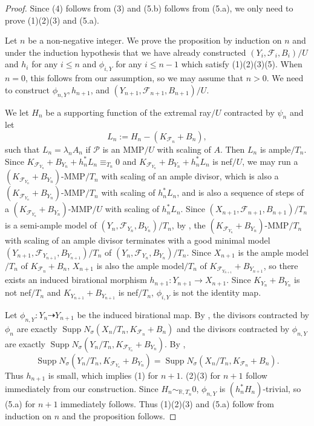 \documentclass[preprint,12pt]{elsarticle}
\newcommand{\Supp}{\operatorname{Supp}}
\newcommand{\Ff}{\mathcal{F}}
\begin{document}
\begin{proof}
Since (4) follows from (3) and (5.b) follows from (5.a), we only need to prove (1)(2)(3) and (5.a).

Let $n$ be a non-negative integer. We prove the proposition by induction on $n$ and under the induction hypothesis that we have already constructed $(Y_i,\Ff_i,B_i)/U$ and $h_i$ for any $i\leq n$ and $\phi_{i,Y}$ for any $i\leq n-1$ which satisfy (1)(2)(3)(5). When $n=0$, this follows from our assumption, so we may assume that $n>0$. We need to construct $\phi_{n,Y},h_{n+1}$, and $(Y_{n+1},\Ff_{n+1},B_{n+1})/U$.

We let $H_n$ be a supporting function of the extremal ray$/U$ contracted by $\psi_n$ and let  
$$L_n:=H_n-(K_{\Ff_n}+B_n),$$
such that $L_n=\lambda_nA_n$ if $\mathcal{P}$ is an MMP$/U$ with scaling of $A$. Then $L_n$ is ample$/T_n$. Since $K_{\Ff_{Y_n}}+B_{Y_n}+h_n^*L_n\equiv_{T_n}0$ and $K_{\Ff_{Y_n}}+B_{Y_n}+h_n^*L_n$ is nef$/U$, we may run a $(K_{\Ff_{Y_n}}+B_{Y_n})$-MMP$/T_n$ with scaling of an ample divisor, which is also a $(K_{\Ff_{Y_n}}+B_{Y_n})$-MMP$/T_n$ with scaling of $h_n^*L_n$, and is also a sequence of steps of a $(K_{\Ff_{Y_n}}+B_{Y_n})$-MMP$/U$ with scaling of $h_n^*L_n$. Since $(X_{n+1},\Ff_{n+1},B_{n+1})/T_n$ is a semi-ample model of $(Y_{n},\Ff_{Y_n},B_{Y_n})/T_n$, by \cite[Theorem 1.11]{LMX24b}, the  $(K_{\Ff_{Y_n}}+B_{Y_n})$-MMP$/T_n$ with scaling of an ample divisor terminates with a good minimal model $(Y_{n+1},\Ff_{Y_{n+1}},B_{Y_{n+1}})/T_n$ of $(Y_{n},\Ff_{Y_{n}},B_{Y_{n}})/T_n$. Since $X_{n+1}$ is the ample model$/T_n$ of $K_{\Ff_n}+B_n$, $X_{n+1}$ is also the ample model$/T_n$ of $K_{\Ff_{Y_{n+1}}}+B_{Y_{n+1}}$, so there exists an induced birational morphism $h_{n+1}: Y_{n+1}\rightarrow X_{n+1}$. Since $K_{Y_n}+B_{Y_n}$ is not nef$/T_n$ and $K_{Y_{n+1}}+B_{Y_{n+1}}$ is nef$/T_n$, $\phi_{i,Y}$ is not the identity map.

Let $\phi_{n,Y}: Y_n\dashrightarrow Y_{n+1}$ be the induced birational map. By \cite[Lemma 2.25]{LMX24b}, the divisors contracted by $\phi_n$ are exactly $\Supp N_{\sigma}(X_n/T_n,K_{\Ff_n}+B_n)$ and the divisors contracted by $\phi_{n,Y}$ are exactly $\Supp N_{\sigma}(Y_n/T_n,K_{\Ff_{Y_n}}+B_{Y_n})$. By \cite[Lemma 3.4(2)(3)]{LX23a}, 
$$\Supp N_{\sigma}(Y_n/T_n,K_{\Ff_{Y_n}}+B_{Y_n})=\Supp N_{\sigma}(X_n/T_n,K_{\Ff_n}+B_n).$$
Thus $h_{n+1}$ is small, which implies (1) for $n+1$. (2)(3) for $n+1$ follow immediately from our construction. Since $H_n\sim_{\mathbb R,T_n}0$, $\phi_{n,Y}$ is $(h_n^*H_n)$-trivial, so (5.a) for $n+1$ immediately follows. Thus (1)(2)(3) and (5.a) follow from induction on $n$ and the proposition follows.
\end{proof}
\end{document}
